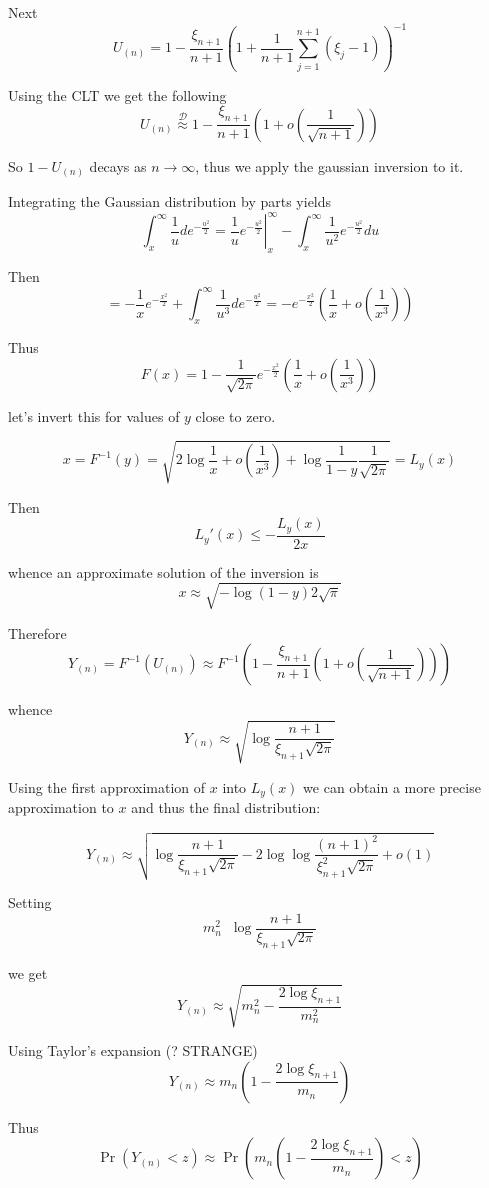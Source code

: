 \documentclass[a4paper]{article}
\newcommand{\brac}[1]{{\left ( #1 \right )}}
\newcommand{\induc}[1]{{\left . #1 \right \vert}}
\newcommand{\Dcal}{\mathcal{D}}
\newcommand{\defn}{\mathop{\overset{\Delta}{=}}\nolimits}
\begin{document}
Next
\[U_{(n)} = 1-\frac{ \xi_{n+1}}{n+1}\brac{1 + \frac{1}{n+1}\sum_{j=1}^{n+1} {(\xi_j-1)}}^{-1}\]

Using the CLT we get the following
\[U_{(n)} \overset{\Dcal}{\approx} 1-\frac{\xi_{n+1}}{n+1}\brac{1+o(\frac{1}{\sqrt{n+1}})}\]

So $1-U_{(n)}$ decays as $n\to \infty$, thus we apply the gaussian inversion to it.

Integrating the Gaussian distribution by parts yields
\[\int_x^\infty \frac{1}{u} de^{-\frac{u^2}{2}} =  \induc{ \frac{1}{u} e^{-\frac{u^2}{2}} }_x^\infty - \int_x^\infty \frac{1}{u^2} e^{-\frac{u^2}{2}}du\]

Then 
\[= - \frac{1}{x} e^{-\frac{x^2}{2}}
+ \int_x^\infty \frac{1}{u^3} de^{-\frac{u^2}{2}} 
= - e^{-\frac{x^2}{2}} \brac{\frac{1}{x} + o(\frac{1}{x^3})}\]

Thus
\[F(x) = 1 - \frac{1}{\sqrt{2\pi}}e^{-\frac{x^2}{2}} \brac{\frac{1}{x} + o(\frac{1}{x^3})}\]

let's invert this for values of $y$ close to zero.

\[ x = F^{-1}(y) = \sqrt{ 2\log{\frac{1}{x}+o(\frac{1}{x^3})} + \log \frac{1}{1-y}\frac{1}{\sqrt{2\pi}}} = L_y(x) \]

Then 
\[L_y'(x) \leq - \frac{L_y(x)}{2x}\]

whence an approximate solution of the inversion is
\[ x\approx \sqrt{-\log{(1-y)2\sqrt{\pi}}}\]

Therefore
\[Y_{(n)} = F^{-1}(U_{(n)}) \approx F^{-1}\brac{1-\frac{\xi_{n+1}}{n+1}\brac{1+o(\frac{1}{\sqrt{n+1}})}}\]

whence 
\[Y_{(n)} \approx \sqrt{ \log \frac{n+1}{\xi_{n+1} \sqrt{2\pi} } } \]

Using the first approximation of $x$ into $L_y(x)$ we can obtain a more precise approximation to $x$ and thus the final distribution:

\[ Y_{(n)} \approx \sqrt{ \log \frac{n+1}{\xi_{n+1} \sqrt{2\pi} } - 2\log \log \frac{{(n+1)}^2}{\xi_{n+1}^2 \sqrt{2\pi} }  + o(1) }  \]

Setting 
\[m_n^2 \defn \log \frac{n+1}{\xi_{n+1} \sqrt{2\pi} } \]

we get 
\[Y_{(n)} \approx \sqrt{ m_n^2 - \frac{2\log \xi_{n+1}}{m_n^2} }\]

Using Taylor's expansion (? STRANGE)
\[Y_{(n)} \approx m_n\brac{ 1 - \frac{2\log \xi_{n+1}}{m_n} }\]

Thus 
\[\Pr\brac{ Y_{(n)} < z } \approx \Pr\brac{ m_n\brac{ 1 - \frac{2\log \xi_{n+1}}{m_n} } < z } \]
\end{document}
